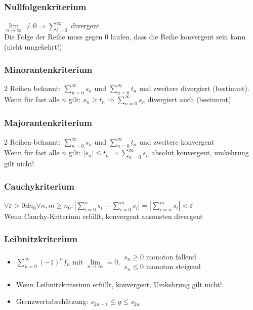\documentclass[a4paper,portrait]{scrartcl}
\begin{document}
\subsubsection{Nullfolgenkriterium}
$ \lim\limits_{n \rightarrow \infty} \neq 0 \Rightarrow \sum_{i=0}^{\infty} $ divergent \\
Die Folge der Reihe muss gegen 0 laufen, dass die Reihe konvergent sein kann (nicht umgekehrt!)
\subsubsection{Minorantenkriterium}
2 Reihen bekannt: $\sum_{n=0}^{\infty} s_n$ und $\sum_{n=0}^{\infty} t_n$ und zweitere divergiert (bestimmt). \\
Wenn für fast alle $n$ gilt: $ s_n \geq t_n \Rightarrow \sum_{n=0}^{\infty} s_n $ divergiert auch (bestimmt)
\subsubsection{Majorantenkriterium}
2 Reihen bekannt: $\sum_{n=0}^{\infty} s_n$ und $\sum_{n=0}^{\infty} t_n$ und zweitere konvergent \\
Wenn für fast alle $n$ gilt: $ |s_n| \leq t_n \Rightarrow \sum_{n=0}^{\infty} s_n $ absolut konvergent, umkehrung gilt nicht!
\subsubsection{Cauchykriterium}
$ \forall \varepsilon > 0 \exists n_0 \forall n,m \geq n_0: |\sum_{i=0}^{n} s_i - \sum_{i=0}^{m} s_i| = |\sum_{i=n}^{m} s_i| < \varepsilon$ \\
Wenn Cauchy-Kriterium erfüllt, konvergent ansonsten divergent
\subsubsection{Leibnitzkriterium}
\begin{itemize}
	\item $ \sum_{n=0}^{\infty} (-1)^n f_n $ mit $ \lim\limits_{n \rightarrow \infty} = 0,
	\begin{array}{ll}
	s_n \geq 0 \text{ monoton fallend } \\
	s_n \leq 0 \text{ monoton steigend } 
	\end{array}
	$ 
	\item Wenn Leibnitzkriterium erfüllt, konvergent, Umkehrung gilt nicht! 
	\item Grenzwertabschätzung: $ s_{2n-1} \leq g \leq s_{2n} $
\end{itemize}
\end{document}
